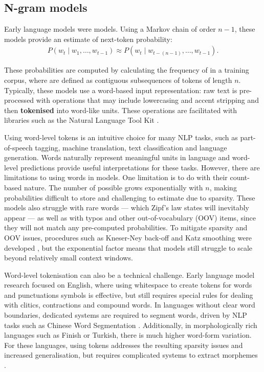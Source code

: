\subsection{N-gram models}\label{sec:12-ngrams}

Early language models were \ngram models. Using a Markov chain of order $n-1$, these models provide an estimate of next-token probability:
\begin{align}
    P\left(w_t \mid w_1, \dots, w_{t-1} \right) \approx P\left(w_t \mid w_{t-(n-1)}, \dots, w_{t-1}\right).\label{eq:ngram}
\end{align}

These probabilities are computed by calculating the frequency of \ngrams in a training corpus, where \ngrams are defined as contiguous subsequences of tokens of length $n$. Typically, these models use a word-based input representation: raw text is pre-processed with operations that may include lowercasing and accent stripping and then \textbf{tokenised} into word-like units. These operations are facilitated with libraries such as the Natural Language Tool Kit \citep[NLTK;][]{bird2009nltk}. 

Using word-level tokens is an intuitive choice for many NLP tasks, such as part-of-speech tagging, machine translation, text classification and language generation. Words naturally represent meaningful units in language and word-level predictions provide useful interpretations for these tasks. However, there are limitations to using words in \ngram models. One limitation is to do with their count-based nature. The number of possible \ngrams grows exponentially with $n$, making probabilities difficult to store and challenging to estimate due to sparsity. These models also struggle with rare words --- which Zipf's law states will inevitably appear \citep{zipf_human_1949} --- as well as with typos and other out-of-vocabulary (OOV) items, since they will not match any pre-computed \ngram probabilities. To mitigate sparsity and OOV issues, procedures such as Kneser-Ney back-off and Katz smoothing were developed \citep{ney1994structuring, katz2003estimation}, but the exponential factor means that \ngram models still struggle to scale beyond relatively small context windows.

Word-level tokenisation can also be a technical challenge. Early language model research focused on English, where using whitespace to create tokens for words and punctuations symbols is effective, but still requires special rules for dealing with clitics, contractions and compound words. In languages without clear word boundaries, dedicated systems are required to segment words, driven by NLP tasks such as Chinese Word Segmentation \citep{zhang-etal-2003-hhmm}. Additionally, in morphologically rich languages such as Finish or Turkish, there is much higher word-form variation. For these languages, using  tokens addresses the resulting sparsity issues and increased generalisation, but requires complicated systems to extract morphemes \citep{creutz2005unsupervised,habash2009}. %

